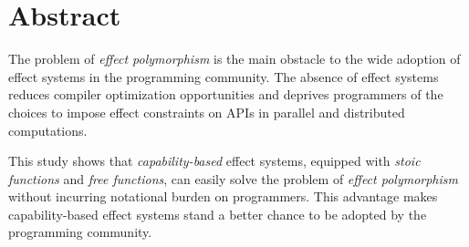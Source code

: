 \section*{\centering Abstract}

The problem of \emph{effect polymorphism} is the main obstacle to the
wide adoption of effect systems in the programming community. The
absence of effect systems reduces compiler optimization opportunities
and deprives programmers of the choices to impose effect constraints
on APIs in parallel and distributed computations.

This study shows that \emph{capability-based} effect systems, equipped
with \emph{stoic functions} and \emph{free functions}, can easily
solve the problem of \emph{effect polymorphism} without incurring
notational burden on programmers. This advantage makes
capability-based effect systems stand a better chance to be adopted by
the programming community.
